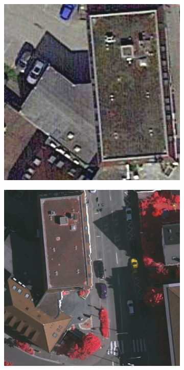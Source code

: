 \begin{figure}[H]
\begin{subfigure}{0.19\columnwidth}
  \centering
  \includegraphics[width=1\linewidth]{fig/comp_manual/building1_google.jpg}
\end{subfigure}
\begin{subfigure}{0.19\columnwidth}
  \centering
  \includegraphics[width=1\linewidth]{fig/comp_manual/building_1_rgb2.png}  

\end{subfigure}
\end{figure}
